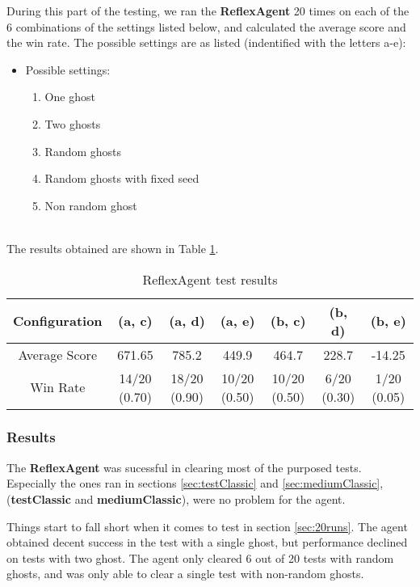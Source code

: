 \documentclass{article}
\begin{document}
During this part of the testing, we ran the \textbf{ReflexAgent} 20 times on each of the 6 combinations of the settings listed below, and calculated the average score and the win rate. The possible settings are as listed (indentified with the letters a-e):

\begin{itemize}
  \item Possible settings:
  \begin{enumerate}[label=(\alph*)]
    \item One ghost
    \item Two ghosts
    \item Random ghosts
    \item Random ghosts with fixed seed
    \item Non random ghost
  \end{enumerate}
\end{itemize}

~\\
The results obtained are shown in Table \ref{tab:reflexagent}.

\begin{table}[!ht]
  \begin{center}
  \begin{tabular}{||c||c|c|c|c|c|c||}
  \hline
  Configuration & (a, c) & (a, d) & (a, e) & (b, c) & (b, d) & (b, e) \\
  \hline\hline
  Average Score & 671.65 & 785.2 & 449.9 & 464.7 & 228.7 & -14.25 \\
  \hline\hline
  Win Rate & 14/20 (0.70) & 18/20 (0.90) & 10/20 (0.50) & 10/20 (0.50) & 6/20 (0.30) & 1/20 (0.05) \\
  \hline
  \end{tabular}
  \caption{ReflexAgent test results}
  \label{tab:reflexagent}
  \end{center}
\end{table}

\subsubsection{Results}
The \textbf{ReflexAgent} was sucessful in clearing most of the purposed tests. Especially the ones ran in sections \ref{sec:testClassic} and \ref{sec:mediumClassic}, (\textbf{testClassic} and \textbf{mediumClassic}), were no problem for the agent.

Things start to fall short when it comes to test in section \ref{sec:20runs}. The agent obtained decent success in the test with a single ghost, but performance declined on tests with two ghost. The agent only cleared 6 out of 20 tests with random ghosts, and was only able to clear a single test with non-random ghosts.
\end{document}
